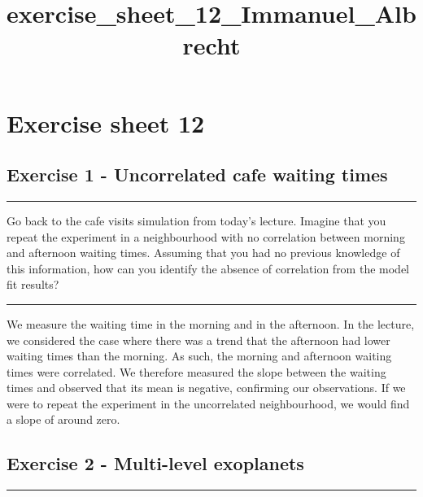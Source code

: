 \documentclass[11pt]{article}
\title{exercise\_sheet\_12\_Immanuel\_Albrecht}
\begin{document}
    
    \maketitle
    
    

    
    \hypertarget{exercise-sheet-12}{%
\section{Exercise sheet 12}\label{exercise-sheet-12}}

\hypertarget{exercise-1---uncorrelated-cafe-waiting-times}{%
\subsection{Exercise 1 - Uncorrelated cafe waiting
times}\label{exercise-1---uncorrelated-cafe-waiting-times}}

\begin{center}\rule{0.5\linewidth}{0.5pt}\end{center}

Go back to the cafe visits simulation from today's lecture. Imagine that
you repeat the experiment in a neighbourhood with no correlation between
morning and afternoon waiting times. Assuming that you had no previous
knowledge of this information, how can you identify the absence of
correlation from the model fit results?

\begin{center}\rule{0.5\linewidth}{0.5pt}\end{center}

We measure the waiting time in the morning and in the afternoon. In the
lecture, we considered the case where there was a trend that the
afternoon had lower waiting times than the morning. As such, the morning
and afternoon waiting times were correlated. We therefore measured the
slope between the waiting times and observed that its mean is negative,
confirming our observations. If we were to repeat the experiment in the
uncorrelated neighbourhood, we would find a slope of around zero.

    \hypertarget{exercise-2---multi-level-exoplanets}{%
\subsection{Exercise 2 - Multi-level
exoplanets}\label{exercise-2---multi-level-exoplanets}}

\begin{center}\rule{0.5\linewidth}{0.5pt}\end{center}
\end{document}
